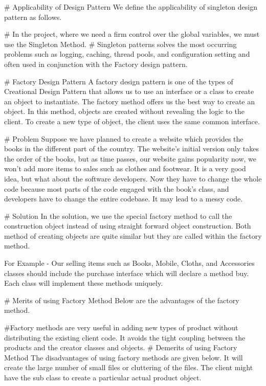 # Applicability of Design Pattern
We define the applicability of singleton design pattern as follows.

# In the project, where we need a firm control over the global variables, we must use the Singleton Method.
# Singleton patterns solves the most occurring problems such as logging, caching, thread pools, and configuration setting and often used in conjunction with the Factory design pattern.


# Factory Design Pattern
A factory design pattern is one of the types of Creational Design Pattern that allows us to use an interface or a class to create an object to instantiate. The factory method offers us the best way to create an object. In this method, objects are created without revealing the logic to the client. To create a new type of object, the client uses the same common interface.


# Problem
Suppose we have planned to create a website which provides the books in the different part of the country. The website's initial version only takes the order of the books, but as time passes, our website gains popularity now, we won't add more items to sales such as clothes and footwear. It is a very good idea, but what about the software developers. Now they have to change the whole code because most parts of the code engaged with the book's class, and developers have to change the entire codebase. It may lead to a messy code.


# Solution
In the solution, we use the special factory method to call the construction object instead of using straight forward object construction. Both method of creating objects are quite similar but they are called within the factory method.

For Example - Our selling items such as Books, Mobile, Cloths, and Accessories classes should include the purchase interface which will declare a method buy. Each class will implement these methods uniquely.



# Merits of using Factory Method
Below are the advantages of the factory method.

#Factory methods are very useful in adding new types of product without distributing the existing client code.
It avoids the tight coupling between the products and the creator classes and objects.
# Demerits of using Factory Method
The disadvantages of using factory methods are given below.
It will create the large number of small files or cluttering of the files.
The client might have the sub class to create a particular actual product object.


